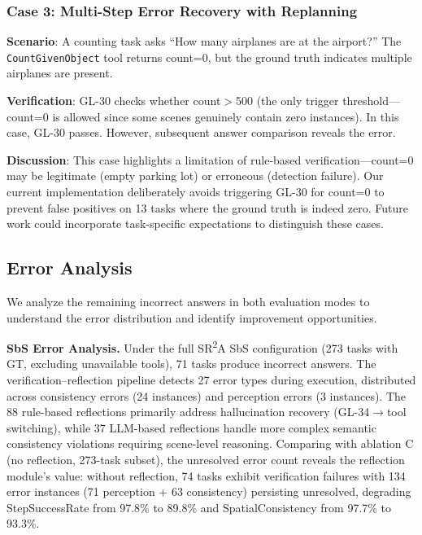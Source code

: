 \documentclass[journal]{IEEEtran}
\begin{document}
\subsubsection{Case 3: Multi-Step Error Recovery with Replanning}

\textbf{Scenario}: A counting task asks ``How many airplanes are at the airport?'' The \texttt{CountGivenObject} tool returns count=0, but the ground truth indicates multiple airplanes are present.

\textbf{Verification}: GL-30 checks whether count$>$500 (the only trigger threshold---count=0 is allowed since some scenes genuinely contain zero instances). In this case, GL-30 passes. However, subsequent answer comparison reveals the error.

\textbf{Discussion}: This case highlights a limitation of rule-based verification---count=0 may be legitimate (empty parking lot) or erroneous (detection failure). Our current implementation deliberately avoids triggering GL-30 for count=0 to prevent false positives on 13 tasks where the ground truth is indeed zero. Future work could incorporate task-specific expectations to distinguish these cases.


\subsection{Error Analysis}
\label{subsec:error_analysis}

We analyze the remaining incorrect answers in both evaluation modes to understand the error distribution and identify improvement opportunities.

\textbf{SbS Error Analysis.}
Under the full SR\textsuperscript{2}A SbS configuration (273 tasks with GT, excluding unavailable tools), 71 tasks produce incorrect answers.
The verification--reflection pipeline detects 27 error types during execution, distributed across consistency errors (24 instances) and perception errors (3 instances).
The 88 rule-based reflections primarily address hallucination recovery (GL-34$\rightarrow$tool switching), while 37 LLM-based reflections handle more complex semantic consistency violations requiring scene-level reasoning.
Comparing with ablation C (no reflection, 273-task subset), the unresolved error count reveals the reflection module's value: without reflection, 74 tasks exhibit verification failures with 134 error instances (71 perception + 63 consistency) persisting unresolved, degrading StepSuccessRate from 97.8\% to 89.8\% and SpatialConsistency from 97.7\% to 93.3\%.
\end{document}
